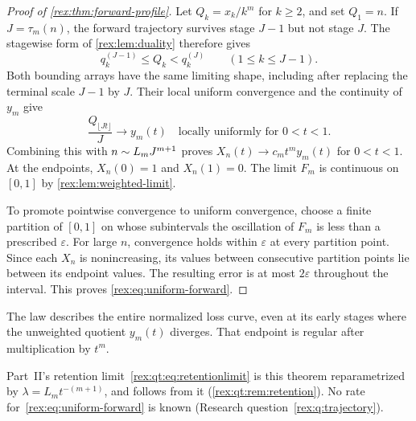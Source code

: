 \begin{proof}[Proof of \cref{rex:thm:forward-profile}]
Let $Q_k=x_k/k^m$ for $k\geq2$, and set $Q_1=n$. If
$J=\tau_m(n)$, the forward trajectory survives stage $J-1$ but not
stage $J$. The stagewise form of \cref{rex:lem:duality} therefore gives
\begin{equation}\label{rex:eq:forward-sandwich}
 q_k^{(J-1)}\leq Q_k<q_k^{(J)}
 \qquad(1\leq k\leq J-1).
\end{equation}
Both bounding arrays have the same limiting shape, including after
replacing the terminal scale $J-1$ by $J$. Their local uniform
convergence and the continuity of $y_m$ give
\[
 \frac{Q_{\lfloor Jt\rfloor}}J\longrightarrow y_m(t)
 \quad\text{locally uniformly for }0<t<1.
\]
Combining this with $n\mathrel{\sim} L_mJ^{m+1}$ proves
$X_n(t)\to c_m t^m y_m(t)$ for $0<t<1$.
At the endpoints, $X_n(0)=1$ and $X_n(1)=0$. The limit $F_m$ is
continuous on $[0,1]$ by \cref{rex:lem:weighted-limit}.

To promote pointwise convergence to uniform convergence, choose a finite
partition of $[0,1]$ on whose subintervals the oscillation of $F_m$ is
less than a prescribed $\varepsilon$. For large $n$, convergence holds
within $\varepsilon$ at every partition point. Since each $X_n$ is
nonincreasing, its values between consecutive partition points lie
between its endpoint values. The resulting error is at most
$2\varepsilon$ throughout the interval. This proves
\cref{rex:eq:uniform-forward}.
\end{proof}

The law describes the entire normalized loss curve, even at its early
stages where the unweighted quotient $y_m(t)$ diverges. That endpoint
is regular after multiplication by $t^m$.

\begin{writenote}
Part~II's retention limit~\eqref{rex:qt:eq:retentionlimit} is this theorem
reparametrized by $\lambda=L_mt^{-(m+1)}$, and follows from it
(\cref{rex:qt:rem:retention}). No rate for~\eqref{rex:eq:uniform-forward}
is known (Research question~\ref{rex:q:trajectory}).
\end{writenote}





